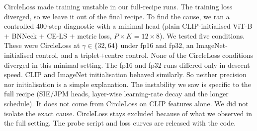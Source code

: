 CircleLoss made training unstable in our full-recipe runs. The training loss diverged,
so we leave it out of the final recipe. To find the cause, we ran a controlled 400-step
diagnostic with a minimal head (plain CLIP-initialised ViT-B $+$ BNNeck $+$ CE-LS $+$ metric loss,
$P{\times}K=12{\times}8$). We tested five conditions. These were CircleLoss at
$\gamma\in\{32,64\}$ under fp16 and fp32, an ImageNet-initialised control, and
a triplet$+$centre control. None of the CircleLoss conditions diverged
in this minimal setting. The fp16 and fp32 runs differed only in descent speed.
CLIP and ImageNet initialisation behaved similarly. So neither precision nor
initialisation is a simple explanation. The instability we saw is specific to the
full recipe (SIE/JPM heads, layer-wise learning-rate decay and the longer schedule).
It does not come from CircleLoss on CLIP features alone. We did not isolate the exact cause.
CircleLoss stays excluded because of what we observed in the full setting.
The probe script and loss curves are released with the code.
